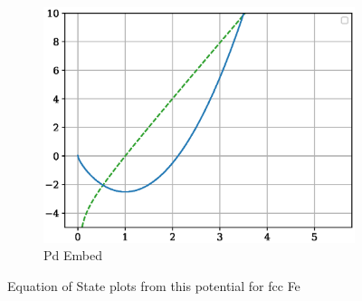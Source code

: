 \begin{figure}[htb]
\begin{subfigure}{.32\textwidth}
  \includegraphics[width=.94\linewidth]{chapters/potentials_fe_pd_ru/fepd_potential/pd_embe.eps}  
  \caption{Pd Embed}
  \label{fig:fepd-pot-pdembe}
\end{subfigure}
\label{fig:fig:fepd-fefcc-equation-of-state}
\caption{Equation of State plots from this potential for \acrshort{fcc} Fe}
\end{figure}



